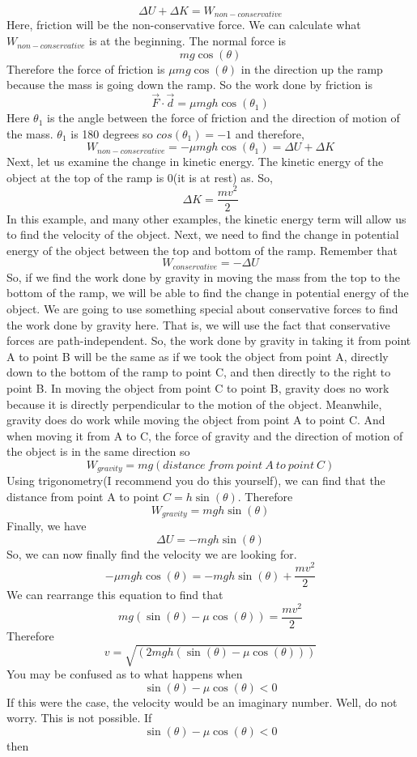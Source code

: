 \documentclass{article}[gray]
\numberwithin{equation}{subsection}
\begin{document}
$$\Delta U+\Delta K=W_{non-conservative}$$ Here, friction will be the non-conservative force. We can calculate what $W_{non-conservative}$ is at the beginning. The normal force is $$mg\cos\left(\theta \right)$$ Therefore the force of friction is $\mu mg\cos\left(\theta \right)$ in the direction up the ramp because the mass is going down the ramp. So the work done by friction is $$\vec{F} \cdot \vec{d}=\mu mgh\cos\left(\theta_1 \right)$$ Here $\theta_1$ is the angle between the force of friction and the direction of motion of the mass. $\theta_1$ is 180 degrees so $cos\left(\theta_1 \right)=-1$ and therefore,  $$W_{non-conservative}=-\mu mgh\cos\left(\theta_1 \right)=\Delta U+\Delta K$$ Next, let us examine the change in kinetic energy. The kinetic energy of the object at the top of the ramp is 0(it is at rest) as. So, $$\Delta K=\frac{mv^2}{2}$$ In this example, and many other examples, the kinetic energy term will allow us to find the velocity of the object. Next, we need to find the change in potential energy of the object between the top and bottom of the ramp. Remember that $$W_{conservative}=-\Delta U$$ So, if we find the work done by gravity in moving the mass from the top to the bottom of the ramp, we will be able to find the change in potential energy of the object. We are going to use something special about conservative forces to find the work done by gravity here. That is, we will use the fact that conservative forces are path-independent. So, the work done by gravity in taking it from point A to point B will be the same as if we took the object from point A, directly down to the bottom of the ramp to point C, and then directly to the right to point B. In moving the object from point C to point B, gravity does no work because it is directly perpendicular to the motion of the object. Meanwhile, gravity does do work while moving the object from point A to point C. And when moving it from A to C, the force of gravity and the direction of motion of the object is in the same direction so $$W_{gravity}=mg\left(distance\ from\ point\ A\ to\ point\ C \right)$$ Using trigonometry(I recommend you do this yourself), we can find that the distance from point A to point $C=h\sin\left(\theta \right)$. Therefore \begin{equation}W_{gravity}=mgh\sin\left(\theta \right)\end{equation} Finally, we have \begin{equation}\Delta U=-mgh\sin\left(\theta \right)\end{equation} So, we can now finally find the velocity we are looking for. $$-\mu mgh\cos\left(\theta \right)=-mgh\sin\left(\theta \right)+\frac{mv^2}{2}$$ We can rearrange this equation to find that $$mg\left(\sin\left(\theta \right )-\mu \cos\left(\theta \right)\right)=\frac{mv^2}{2}$$ Therefore \begin{equation}v=\sqrt{\left(2mgh\left(\sin\left(\theta \right)-\mu \cos\left(\theta \right)\right)\right)}\end{equation} You may be confused as to what happens when $$\sin\left(\theta \right)-\mu \cos\left(\theta \right) < 0$$ If this were the case, the velocity would be an imaginary number. Well, do not worry. This is not possible. If $$\sin\left(\theta \right)-\mu \cos \left(\theta \right) < 0$$ then 
\end{document}
